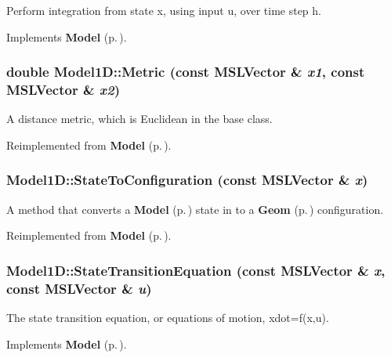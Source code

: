 Perform integration from state x, using input u, over time step h.



Implements {\bf Model} {\rm (p.\,\pageref{classModel_a5})}.
\subsubsection{\setlength{\rightskip}{0pt plus 5cm}double Model1D::Metric (const {\bf MSLVector} \& {\em x1}, const {\bf MSLVector} \& {\em x2})\hspace{0.3cm}{\tt  [virtual]}}\label{classModel1D_a5}


A distance metric, which is Euclidean in the base class.



Reimplemented from {\bf Model} {\rm (p.\,\pageref{classModel_a9})}.
\subsubsection{ Model1D::State\-To\-Configuration (const {\bf MSLVector} \& {\em x})\hspace{0.3cm}{\tt  [virtual]}}\label{classModel1D_a2}


A method that converts a {\bf Model} {\rm (p.\,\pageref{classModel})} state in to a {\bf Geom} {\rm (p.\,\pageref{classGeom})} configuration.



Reimplemented from {\bf Model} {\rm (p.\,\pageref{classModel_a8})}.
\subsubsection{ Model1D::State\-Transition\-Equation (const {\bf MSLVector} \& {\em x}, const {\bf MSLVector} \& {\em u})\hspace{0.3cm}{\tt  [virtual]}}\label{classModel1D_a4}


The state transition equation, or equations of motion, xdot=f(x,u).



Implements {\bf Model} {\rm (p.\,\pageref{classModel_a3})}.

